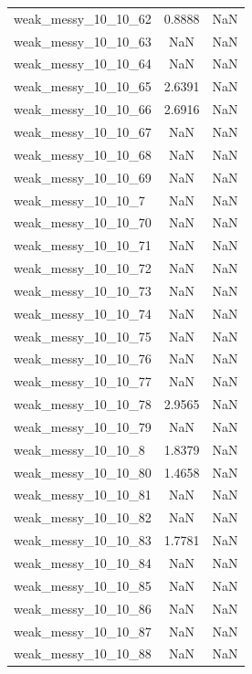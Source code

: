 \begin{longtable}{lcc}
weak\_messy\_10\_10\_62    &   0.8888 &     NaN \\
weak\_messy\_10\_10\_63    &      NaN &     NaN \\
weak\_messy\_10\_10\_64    &      NaN &     NaN \\
weak\_messy\_10\_10\_65    &   2.6391 &     NaN \\
weak\_messy\_10\_10\_66    &   2.6916 &     NaN \\
weak\_messy\_10\_10\_67    &      NaN &     NaN \\
weak\_messy\_10\_10\_68    &      NaN &     NaN \\
weak\_messy\_10\_10\_69    &      NaN &     NaN \\
weak\_messy\_10\_10\_7     &      NaN &     NaN \\
weak\_messy\_10\_10\_70    &      NaN &     NaN \\
weak\_messy\_10\_10\_71    &      NaN &     NaN \\
weak\_messy\_10\_10\_72    &      NaN &     NaN \\
weak\_messy\_10\_10\_73    &      NaN &     NaN \\
weak\_messy\_10\_10\_74    &      NaN &     NaN \\
weak\_messy\_10\_10\_75    &      NaN &     NaN \\
weak\_messy\_10\_10\_76    &      NaN &     NaN \\
weak\_messy\_10\_10\_77    &      NaN &     NaN \\
weak\_messy\_10\_10\_78    &   2.9565 &     NaN \\
weak\_messy\_10\_10\_79    &      NaN &     NaN \\
weak\_messy\_10\_10\_8     &   1.8379 &     NaN \\
weak\_messy\_10\_10\_80    &   1.4658 &     NaN \\
weak\_messy\_10\_10\_81    &      NaN &     NaN \\
weak\_messy\_10\_10\_82    &      NaN &     NaN \\
weak\_messy\_10\_10\_83    &   1.7781 &     NaN \\
weak\_messy\_10\_10\_84    &      NaN &     NaN \\
weak\_messy\_10\_10\_85    &      NaN &     NaN \\
weak\_messy\_10\_10\_86    &      NaN &     NaN \\
weak\_messy\_10\_10\_87    &      NaN &     NaN \\
weak\_messy\_10\_10\_88    &      NaN &     NaN \\

\end{longtable}
